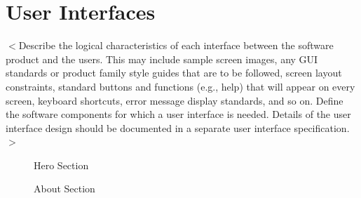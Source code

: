 \documentclass[oneside,a4paper,12pt,explicit]{book}
\begin{document}
\section{User Interfaces}
$<$Describe the logical characteristics of each interface between the software 
product and the users. This may include sample screen images, any GUI standards 
or product family style guides that are to be followed, screen layout 
constraints, standard buttons and functions (e.g., help) that will appear on 
every screen, keyboard shortcuts, error message display standards, and so on.  
Define the software components for which a user interface is needed. Details of 
the user interface design should be documented in a separate user interface 
specification.$>$
\begin{figure}[H]
    \centering
    \begin{minipage}{0.4\textwidth}
        \centering
        \caption{Hero Section}
    \end{minipage}
    \hfill
    \begin{minipage}{0.5\textwidth}
        \centering
        \caption{About Section}
    \end{minipage}
\end{figure}
\end{document}
